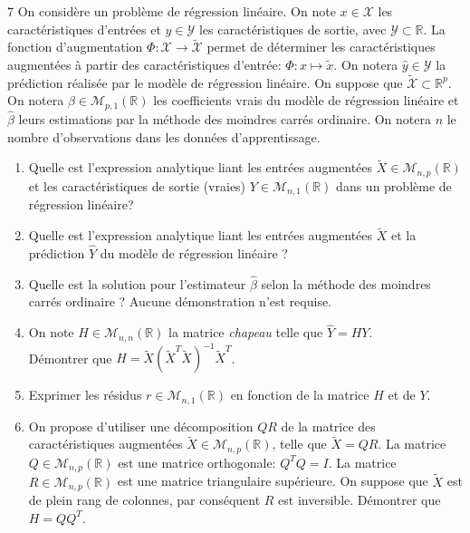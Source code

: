 \documentclass[solutions]{../cc}
\begin{document}
	\begin{exopoints}{7}
		On considère un problème de régression linéaire. On note $x \in \mathcal{X}$ les caractéristiques d'entrées et $y \in \mathcal{Y}$ les caractéristiques de sortie, avec $\mathcal{Y} \subset \mathbb{R}$. La fonction d'augmentation $\Phi: \mathcal{X} \to \tilde{\mathcal{X}}$ permet de déterminer les caractéristiques augmentées à partir des caractéristiques d'entrée: $\Phi: x \mapsto \tilde{x}$. On notera $\hat{y} \in \mathcal{Y}$ la prédiction réalisée par le modèle de régression linéaire. On suppose que $\tilde{\mathcal{X}} \subset \mathbb{R}^p$. On notera $\beta \in \mathcal{M}_{p,1}(\mathbb{R})$ les coefficients vrais du modèle de régression linéaire et $\hat{\beta}$ leurs estimations par la méthode des moindres carrés ordinaire. On notera $n$ le nombre d'observations dans les données d'apprentissage.
		\begin{enumerate}
			\item Quelle est l'expression analytique liant les entrées augmentées $\tilde{X} \in \mathcal{M}_{n,p}(\mathbb{R})$ et les caractéristiques de sortie (vraies) $Y \in \mathcal{M}_{n,1}(\mathbb{R})$ dans un problème de régression linéaire?
			\item Quelle est l'expression analytique liant les entrées augmentées $\tilde{X}$ et la prédiction $\hat{Y}$ du modèle de régression linéaire ?
			\item Quelle est la solution pour l'estimateur $\hat{\beta}$ selon la méthode des moindres carrés ordinaire ? Aucune démonstration n'est requise.
			\item On note $H \in \mathcal{M}_{n,n}(\mathbb{R})$ la matrice \textit{chapeau} telle que $\hat{Y} = HY$. \\Démontrer que $H=\tilde{X}\left(\tilde{X}^T \tilde{X}\right)^{-1} \tilde{X}^T$.
			\item Exprimer les résidus $r \in \mathcal{M}_{n,1}(\mathbb{R})$ en fonction de la matrice $H$ et de $Y$.
			\item On propose d'utiliser une décomposition $QR$ de la matrice des caractéristiques augmentées $\tilde{X} \in \mathcal{M}_{n,p}(\mathbb{R})$, telle que $\tilde{X} = QR$. La matrice $Q \in \mathcal{M}_{n,p}(\mathbb{R})$ est une matrice orthogonale: $Q^T Q = I$. La matrice $R \in \mathcal{M}_{n,p}(\mathbb{R})$ est une matrice triangulaire supérieure. On suppose que $\tilde{X}$ est de plein rang de colonnes, par conséquent $R$ est inversible. Démontrer que $H = QQ^T$.
		\end{enumerate}
	\end{exopoints}
	
\end{document}

